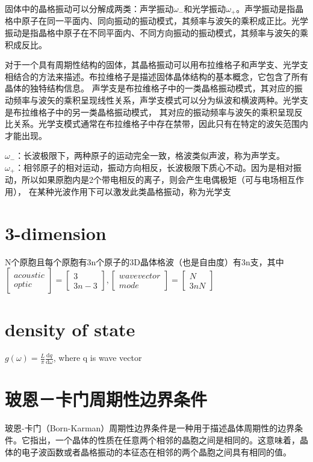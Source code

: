 \documentclass[12pt, a4paper, oneside]{ctexart}
\begin{document}
\begin{spacing}{2.0}
固体中的晶格振动可以分解成两类：声学振动$\omega_-$和光学振动$\omega_+$。声学振动是指晶格中原子在同一平面内、同向振动的振动模式，其频率与波矢的乘积成正比。光学振动是指晶格中原子在不同平面内、不同方向振动的振动模式，其频率与波矢的乘积成反比。

对于一个具有周期性结构的固体，其晶格振动可以用布拉维格子和声学支、光学支相结合的方法来描述。布拉维格子是描述固体晶体结构的基本概念，它包含了所有晶体的独特结构信息。
声学支是布拉维格子中的一类晶格振动模式，其对应的振动频率与波矢的乘积呈现线性关系，声学支模式可以分为纵波和横波两种。光学支是布拉维格子中的另一类晶格振动模式，
其对应的振动频率与波矢的乘积呈现反比关系。光学支模式通常在布拉维格子中存在禁带，因此只有在特定的波矢范围内才能出现。

$\omega_-$：长波极限下，两种原子的运动完全一致，格波类似声波，称为声学支。\\
$\omega_+$：相邻原子的相对运动，振动方向相反，长波极限下质心不动。因为是相对振动，所以如果原胞内是2个带电相反的离子，则会产生电偶极矩（可与电场相互作用），
在某种光波作用下可以激发此类晶格振动，称为光学支
\section{3-dimension}
N个原胞且每个原胞有3n个原子的3D晶体格波（也是自由度）有3n支，其中
$\begin{bmatrix}
    acoustic\\
    optic
  \end{bmatrix}
  =\begin{bmatrix}
   3 \\
   3n-3 
  \end{bmatrix},
  \begin{bmatrix}
    wave vector\\
    mode
  \end{bmatrix}
  =\begin{bmatrix}
    N \\
    3nN 
   \end{bmatrix}
   $

\section{density of state}
$g(\omega) = \frac{L}{\pi}\frac{\mathrm{d} q}{\mathrm{d}\omega}$, 
where q is wave vector
\section{玻恩－卡门周期性边界条件}
玻恩-卡门（Born-Karman）周期性边界条件是一种用于描述晶体周期性的边界条件。它指出，一个晶体的性质在任意两个相邻的晶胞之间是相同的。这意味着，晶体的电子波函数或者晶格振动的本征态在相邻的两个晶胞之间具有相同的值。


\end{spacing}
\end{document}
